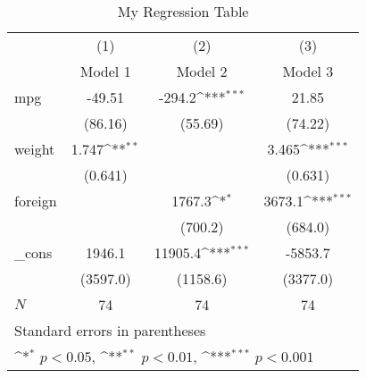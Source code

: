 \begin{table}[htbp]\centering
\def\sym#1{\ifmmode^{#1}\else\(^{#1}\)\fi}
\caption{My Regression Table}
\begin{tabular}{l*{3}{c}}
\toprule
          &\multicolumn{1}{c}{(1)}&\multicolumn{1}{c}{(2)}&\multicolumn{1}{c}{(3)}\\
          &\multicolumn{1}{c}{Model 1}&\multicolumn{1}{c}{Model 2}&\multicolumn{1}{c}{Model 3}\\
\midrule
mpg       &   -49.51         &   -294.2\sym{***}&    21.85         \\
          &  (86.16)         &  (55.69)         &  (74.22)         \\
\addlinespace
weight    &    1.747\sym{**} &                  &    3.465\sym{***}\\
          &  (0.641)         &                  &  (0.631)         \\
\addlinespace
foreign   &                  &   1767.3\sym{*}  &   3673.1\sym{***}\\
          &                  &  (700.2)         &  (684.0)         \\
\addlinespace
\_cons    &   1946.1         &  11905.4\sym{***}&  -5853.7         \\
          & (3597.0)         & (1158.6)         & (3377.0)         \\
\midrule
\(N\)     &       74         &       74         &       74         \\
\bottomrule
\multicolumn{4}{l}{\footnotesize Standard errors in parentheses}\\
\multicolumn{4}{l}{\footnotesize \sym{*} \(p<0.05\), \sym{**} \(p<0.01\), \sym{***} \(p<0.001\)}\\
\end{tabular}
\end{table}
